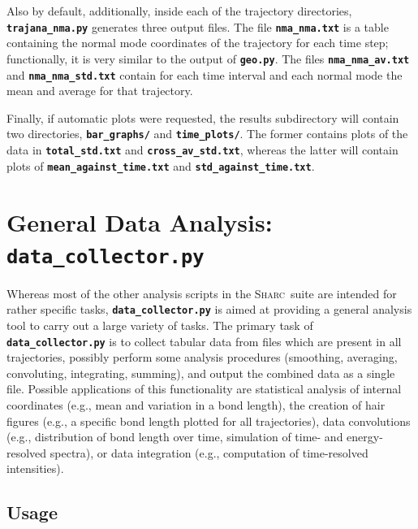 \documentclass[a4paper,10pt,DIV=15,openany,twoside=false]{scrbook}
\newcommand{\sharc}{\textsc{Sharc}}
\newcommand{\ttt}[1]{\textbf{\texttt{#1}}}
\begin{document}
Also by default, additionally, inside each of the trajectory directories, \ttt{trajana\_nma.py} generates three output files.
The file \ttt{nma\_nma.txt} is a table containing the normal mode coordinates of the trajectory for each time step; functionally, it is very similar to the output of \ttt{geo.py}.
The files \ttt{nma\_nma\_av.txt} and \ttt{nma\_nma\_std.txt} contain for each time interval and each normal mode the mean and average for that trajectory.

Finally, if automatic plots were requested, the results subdirectory will contain two directories, \ttt{bar\_graphs/} and \ttt{time\_plots/}.
The former contains plots of the data in \ttt{total\_std.txt} and \ttt{cross\_av\_std.txt}, whereas the latter will contain plots of \ttt{mean\_against\_time.txt} and \ttt{std\_against\_time.txt}.








\section{General Data Analysis: \ttt{data\_collector.py}}\label{sec:data_collector.py}

Whereas most of the other analysis scripts in the \sharc\ suite are intended for rather specific tasks, \ttt{data\_collector.py} is aimed at providing a general analysis tool to carry out a large variety of tasks.
The primary task of \ttt{data\_collector.py} is to collect tabular data from files which are present in all trajectories, possibly perform some analysis procedures (smoothing, averaging, convoluting, integrating, summing), and output the combined data as a single file.
Possible applications of this functionality are statistical analysis of internal coordinates (e.g., mean and variation in a bond length), the creation of hair figures (e.g., a specific bond length plotted for all trajectories), data convolutions (e.g., distribution of bond length over time, simulation of time- and energy-resolved spectra), or data integration (e.g., computation of time-resolved intensities).

\subsection{Usage}
\end{document}
